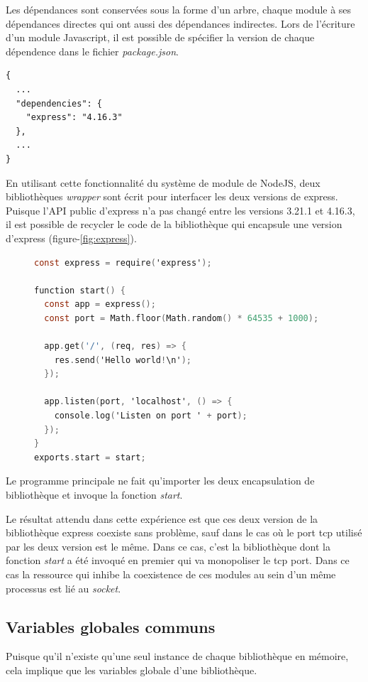 Les dépendances sont conservées sous la forme d'un arbre, chaque module à ses dépendances directes
qui ont aussi des dépendances indirectes.  Lors de l'écriture d'un module Javascript, il est possible
de spécifier la version de chaque dépendence dans le fichier \textit{package.json}.
\begin{verbatim}
{
  ...
  "dependencies": {
    "express": "4.16.3"
  },
  ...
}
\end{verbatim}
En utilisant cette fonctionnalité du système de module de NodeJS, deux bibliothèques \textit{wrapper}
sont écrit pour interfacer les deux versions de express. Puisque l'API public d'express n'a pas changé entre
les versions 3.21.1 et 4.16.3, il est possible de recycler le code de la bibliothèque qui encapsule une
version d'express (figure-\ref{fig:express}).
\begin{center}
\begin{figure}[ht]
    \begin{lstlisting}[language=C,frame=single]
const express = require('express');

function start() {
  const app = express();
  const port = Math.floor(Math.random() * 64535 + 1000);

  app.get('/', (req, res) => {
    res.send('Hello world!\n');
  });

  app.listen(port, 'localhost', () => {
    console.log('Listen on port ' + port);
  });
}
exports.start = start;
\end{lstlisting}
\end{figure}
\label{fig:express}
\end{center}
Le programme principale ne fait qu'importer les deux encapsulation de bibliothèque
et invoque la fonction \textit{start}.

Le résultat attendu dans cette expérience est que ces deux version de la bibliothèque
express coexiste sans problème, sauf dans le cas où le port tcp utilisé par les deux
version est le même. Dans ce cas, c'est la bibliothèque dont la fonction
\textit{start} a été invoqué en premier qui va monopoliser le tcp port. Dans ce cas
la ressource qui inhibe la coexistence de ces modules au sein d'un même processus
est lié au \textit{socket}.

\subsection{Variables globales communs}

Puisque qu'il n'existe qu'une seul instance de chaque bibliothèque en mémoire, cela implique
que les variables globale d'une bibliothèque.


